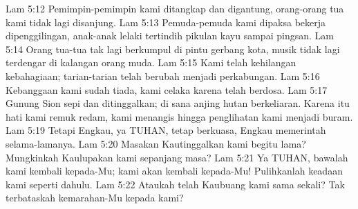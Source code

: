 Lam 5:12  Pemimpin-pemimpin kami ditangkap dan digantung, orang-orang tua kami tidak lagi disanjung.
Lam 5:13  Pemuda-pemuda kami dipaksa bekerja dipenggilingan, anak-anak lelaki tertindih pikulan kayu sampai pingsan.
Lam 5:14  Orang tua-tua tak lagi berkumpul di pintu gerbang kota, musik tidak lagi terdengar di kalangan orang muda.
Lam 5:15  Kami telah kehilangan kebahagiaan; tarian-tarian telah berubah menjadi perkabungan.
Lam 5:16  Kebanggaan kami sudah tiada, kami celaka karena telah berdosa.
Lam 5:17  Gunung Sion sepi dan ditinggalkan; di sana anjing hutan berkeliaran. Karena itu hati kami remuk redam, kami menangis hingga penglihatan kami menjadi buram.
Lam 5:19  Tetapi Engkau, ya TUHAN, tetap berkuasa, Engkau memerintah selama-lamanya.
Lam 5:20  Masakan Kautinggalkan kami begitu lama? Mungkinkah Kaulupakan kami sepanjang masa?
Lam 5:21  Ya TUHAN, bawalah kami kembali kepada-Mu; kami akan kembali kepada-Mu! Pulihkanlah keadaan kami seperti dahulu.
Lam 5:22  Ataukah telah Kaubuang kami sama sekali? Tak terbataskah kemarahan-Mu kepada kami?


